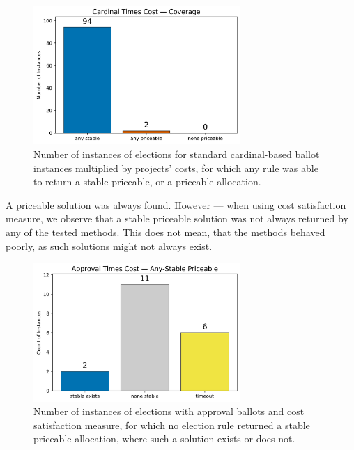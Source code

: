 \begin{figure}[H]         
  \centering              
  \includegraphics[width=0.7\textwidth]{figures/plots/cardinal-times-cost/cardinal_times_cost_coverage_non_exhaustive.png}
  \caption{Number of instances of elections for standard cardinal-based ballot instances multiplied by projects' costs, for which any rule was able to return a stable priceable, or a priceable allocation.}
  \label{fig:myplot}
\end{figure}
A priceable solution was always found. However --- when using cost satisfaction measure, we observe that a stable priceable solution was not always returned by any of the tested methods. This does not mean, that the methods behaved poorly, as such solutions might not always exist.
\begin{figure}[H]         
  \centering              
  \includegraphics[width=0.7\textwidth]{figures/plots/approval-times-cost/approval_times_cost_any_stable_non-exhaustive.png}
  \caption{Number of instances of elections with approval ballots and cost satisfaction measure, for which no election rule returned a stable priceable allocation, where such a solution exists or does not.}
  \label{fig:myplot}
\end{figure}
